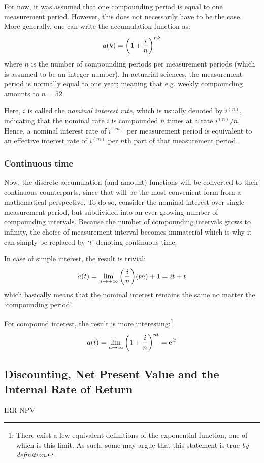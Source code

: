For now, it was assumed that one compounding period is equal to one measurement period. However, this does not necessarily have to be the case. More generally, one can write the accumulation function as:
$$a(k) = \qty(1 + \frac{i}{n})^{nk}$$
where $n$ is the number of compounding periods per measurement periods (which is assumed to be an integer number). In actuarial sciences, the measurement period is normally equal to one year; meaning that e.g. weekly compounding amounts to $n = 52$.

Here, $i$ is called the \emph{nominal interest rate}, which is usually denoted by $i^{(n)}$, indicating that the nominal rate $i$ is compounded $n$ times at a rate $i^{(n)}/n$. Hence, a nominal interest rate of $i^{(m)}$ per measurement period is equivalent to an effective interest rate of $ i^{(m)}$ per $n$th part of that measurement period. 


\subsubsection{Continuous time}
Now, the discrete accumulation (and amount) functions will be converted to their continuous counterparts, since that will be the most convenient form from a mathematical perspective. To do so, consider the nominal interest over single measurement period, but subdivided into an ever growing number of compounding intervals. Because the number of compounding intervals grows to infinity, the choice of measurement interval becomes immaterial which is why it can simply be replaced by `$t$' denoting continuous time.

In case of simple interest, the result is trivial:
 $$ a(t) = \lim_{n \to +\infty} \qty(\frac{i}{n}) (tn) + 1 = it + t $$
which basically means that the nominal interest remains the same no matter the `compounding period'.

For compound interest, the result is more interesting:\footnote{There exist a few equivalent definitions of the exponential function, one of which is this limit. As such, some may argue that this statement is true \emph{by definition}.}
 $$ a(t) = \lim_{n \to \infty} \qty(1 + \frac{i}{n})^{nt} = \mathrm{e}^{it}$$
 
\subsection{Discounting, Net Present Value and the Internal Rate of Return}
\ac{IRR}
\ac{NPV}


